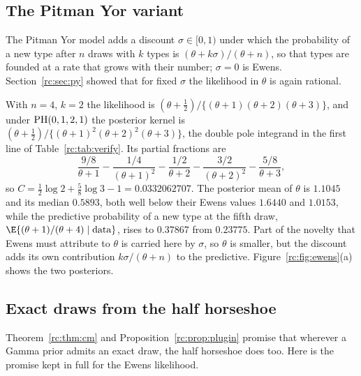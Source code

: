 \subsection{The Pitman Yor variant}

The Pitman Yor model adds a discount $\sigma\in[0,1)$ under which the probability of a new type after $n$ draws with $k$ types is $(\theta+k\sigma)/(\theta+n)$, so that types are founded at a rate that grows with their number; $\sigma=0$ is Ewens. Section~\ref{rc:sec:py} showed that for fixed $\sigma$ the likelihood in $\theta$ is again rational.

\begin{example}[Four genes, two types, $\sigma=\frac12$]\label{rc:ex:py}
With $n=4$, $k=2$ the likelihood is $(\theta+\frac12)/\{(\theta+1)(\theta+2)(\theta+3)\}$, and under $\mathrm{PH}(0,1,2,1)$ the posterior kernel is $(\theta+\frac12)/\{(\theta+1)^2(\theta+2)^2(\theta+3)\}$, the double pole integrand in the first line of Table~\ref{rc:tab:verify}. Its partial fractions are
\[
\frac{9/8}{\theta+1}-\frac{1/4}{(\theta+1)^2}-\frac{1/2}{\theta+2}-\frac{3/2}{(\theta+2)^2}-\frac{5/8}{\theta+3},
\]
so $C=\frac12\log2+\frac58\log3-1=0.0332062707$. The posterior mean of $\theta$ is $1.1045$ and its median $0.5893$, both well below their Ewens values $1.6440$ and $1.0153$, while the predictive probability of a new type at the fifth draw, $\E\{(\theta+1)/(\theta+4)\mid\text{data}\}$, rises to $0.37867$ from $0.23775$. Part of the novelty that Ewens must attribute to $\theta$ is carried here by $\sigma$, so $\theta$ is smaller, but the discount adds its own contribution $k\sigma/(\theta+n)$ to the predictive. Figure~\ref{rc:fig:ewens}(a) shows the two posteriors.
\end{example}

\subsection{Exact draws from the half horseshoe}

Theorem~\ref{rc:thm:cm} and Proposition~\ref{rc:prop:plugin} promise that wherever a Gamma prior admits an exact draw, the half horseshoe does too. Here is the promise kept in full for the Ewens likelihood.

